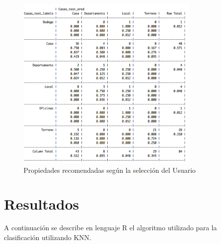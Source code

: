 \begin{figure}[H]
\centering
\includegraphics[width=0.8\textwidth]{ModeloPredictivo.png}
\caption{Propiedades recomendadas según la selección del Usuario}
\label{fig:Clasificador}
\end{figure}


\section{Resultados}
A continuación se describe en lenguaje R el algoritmo utilizado para la clasificación utilizando KNN.

